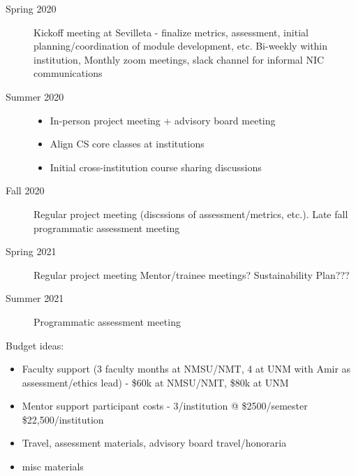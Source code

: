 \begin{description}
    \item[Spring 2020] Kickoff meeting at Sevilleta - finalize metrics, assessment, initial planning/coordination of module development, etc. Bi-weekly within institution, Monthly zoom meetings, slack channel for informal NIC communications
    \item[Summer 2020] 
    \begin{itemize}
        \item In-person project meeting + advisory board meeting
        \item Align CS core classes at institutions 
        \item Initial cross-institution course sharing discussions
    \end{itemize}
    \item[Fall 2020] Regular project meeting (discssions of assessment/metrics, etc.). Late fall programmatic assessment meeting
    \item[Spring 2021] Regular project meeting Mentor/trainee meetings?  Sustainability Plan???
    \item[Summer 2021] Programmatic assessment meeting
\end{description}

Budget ideas:
\begin{itemize}
    \item Faculty support (3 faculty months at NMSU/NMT, 4 at UNM with Amir as assessment/ethics lead) - \$60k at NMSU/NMT, \$80k at UNM
    \item Mentor support participant costs - 3/institution @ \$2500/semester \$22,500/institution
    \item Travel, assessment materials, advisory board travel/honoraria
    \item misc materials
\end{itemize}
